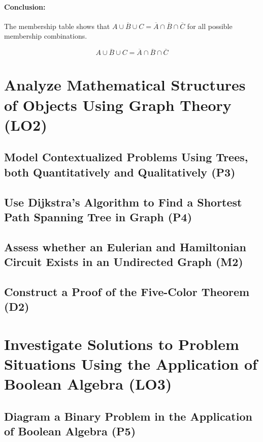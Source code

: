 \documentclass[12pt, a4paper, twoside]{report} %
\begin{document}
\subsubsection*{Conclusion:}
The membership table shows that \( \overline{A \cup B \cup C} = \overline{A} \cap \overline{B} \cap \overline{C} \) for all possible membership combinations.

\[
\boxed{\overline{A \cup B \cup C} = \overline{A} \cap \overline{B} \cap \overline{C}}
\]





\chapter{Analyze Mathematical Structures of Objects Using Graph Theory (LO2)}
\label{chap:LO2}

\section{Model Contextualized Problems Using Trees, both Quantitatively and Qualitatively (P3)}
\label{sec:P3}


\section{Use Dijkstra’s Algorithm to Find a Shortest Path Spanning Tree in Graph (P4)}
\label{sec:P4}

\section{Assess whether an Eulerian and Hamiltonian Circuit Exists in an Undirected Graph (M2)}
\label{sec:M2}

\section{Construct a Proof of the Five-Color Theorem (D2)}
\label{sec:D2}

\chapter{Investigate Solutions to Problem Situations Using the Application of Boolean Algebra (LO3)}
\label{chap:LO3}

\section{Diagram a Binary Problem in the Application of Boolean Algebra (P5)}
\label{sec:P5}
\end{document}
